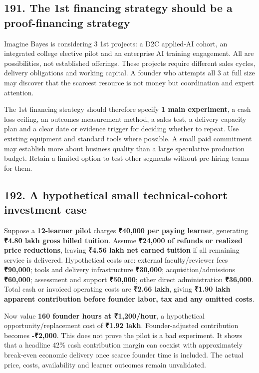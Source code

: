 \subsection{191. The 1st financing strategy should be a proof-financing strategy}


Imagine Bayes is considering 3 1st projects: a D2C applied-AI cohort, an integrated college elective pilot and an enterprise AI training engagement. All are possibilities, not established offerings. These projects require different sales cycles, delivery obligations and working capital. A founder who attempts all 3 at full size may discover that the scarcest resource is not money but coordination and expert attention.

The 1st financing strategy should therefore specify \textbf{1 main experiment}, a cash loss ceiling, an outcomes measurement method, a sales test, a delivery capacity plan and a clear date or evidence trigger for deciding whether to repeat. Use existing equipment and standard tools where possible. A small paid commitment may establish more about business quality than a large speculative production budget. Retain a limited option to test other segments without pre-hiring teams for them.

\subsection{192. A hypothetical small technical-cohort investment case}


Suppose a \textbf{12-learner pilot} charges \textbf{₹40,000 per paying learner}, generating \textbf{₹4.80 lakh gross billed tuition}. Assume \textbf{₹24,000 of refunds or realized price reductions}, leaving \textbf{₹4.56 lakh net earned tuition} if all remaining service is delivered. Hypothetical costs are: external faculty/reviewer fees \textbf{₹90,000}; tools and delivery infrastructure \textbf{₹30,000}; acquisition/admissions \textbf{₹60,000}; assessment and support \textbf{₹50,000}; other direct administration \textbf{₹36,000}. Total cash or invoiced operating costs are \textbf{₹2.66 lakh}, giving \textbf{₹1.90 lakh apparent contribution before founder labor, tax and any omitted costs}.

Now value \textbf{160 founder hours at ₹1,200/hour}, a hypothetical opportunity/replacement cost of \textbf{₹1.92 lakh}. Founder-adjusted contribution becomes \textbf{-₹2,000}. This does not prove the pilot is a bad experiment. It shows that a headline 42\% cash contribution margin can coexist with approximately break-even economic delivery once scarce founder time is included. The actual price, costs, availability and learner outcomes remain unvalidated.

